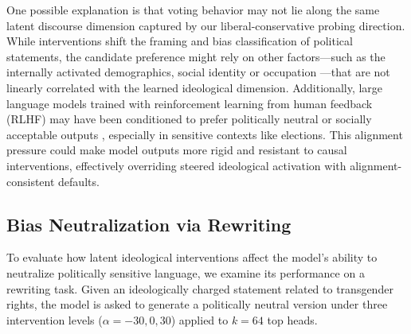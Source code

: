 \documentclass[11pt]{article}
\begin{document}
One possible explanation is that voting behavior may not lie along the same latent discourse dimension captured by our liberal-conservative probing direction. While interventions shift the framing and bias classification of political statements, the candidate preference might rely on other factors—such as the internally activated demographics, social identity or occupation \citep{gaoForecastingElectionsAgentbased2022}—that are not linearly correlated with the learned ideological dimension. Additionally, large language models trained with reinforcement learning from human feedback (RLHF) may have been conditioned to prefer politically neutral or socially acceptable outputs \citep{potterHiddenPersuadersLLMs2024}, especially in sensitive contexts like elections. This alignment pressure could make model outputs more rigid and resistant to causal interventions, effectively overriding steered ideological activation with alignment-consistent defaults.

\subsection{Bias Neutralization via Rewriting}

To evaluate how latent ideological interventions affect the model's ability to neutralize politically sensitive language, we examine its performance on a rewriting task. Given an ideologically charged statement related to transgender rights, the model is asked to generate a politically neutral version under three intervention levels ($\alpha = -30, 0, 30$) applied to $k = 64$ top heads.
\end{document}
